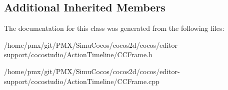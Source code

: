 \subsection*{Additional Inherited Members}


The documentation for this class was generated from the following files\+:\begin{DoxyCompactItemize}
\item 
/home/pmx/git/\+P\+M\+X/\+Simu\+Cocos/cocos2d/cocos/editor-\/support/cocostudio/\+Action\+Timeline/C\+C\+Frame.\+h\item 
/home/pmx/git/\+P\+M\+X/\+Simu\+Cocos/cocos2d/cocos/editor-\/support/cocostudio/\+Action\+Timeline/C\+C\+Frame.\+cpp\end{DoxyCompactItemize}
